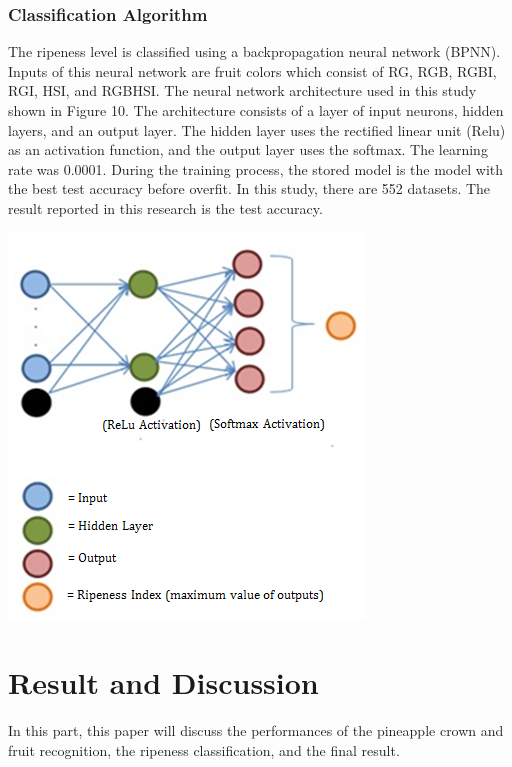 \documentclass[11pt]{article}
\begin{document}
\begin{linenumbers}
\subsubsection{Classification Algorithm}
The ripeness level is classified using a backpropagation neural network (BPNN). Inputs of this neural network are fruit colors which consist of RG, RGB, RGBI, RGI, HSI, and RGBHSI. The neural network architecture used in this study shown in Figure 10. The architecture consists of a layer of input neurons, hidden layers, and an output layer. The hidden layer uses the rectified linear unit (Relu) as an activation function, and the output layer uses the softmax. The learning rate was 0.0001. During the training process, the stored model is the model with the best test accuracy before overfit. In this study, there are 552 datasets. The result reported in this research is the test accuracy. 
\begin{center}
	\includegraphics[scale=0.6]{images/net}
\end{center}

\section{Result and Discussion}
In this part, this paper will discuss the performances of the pineapple crown and fruit recognition, the ripeness classification, and the final result.
 

\end{linenumbers}
\end{document}
